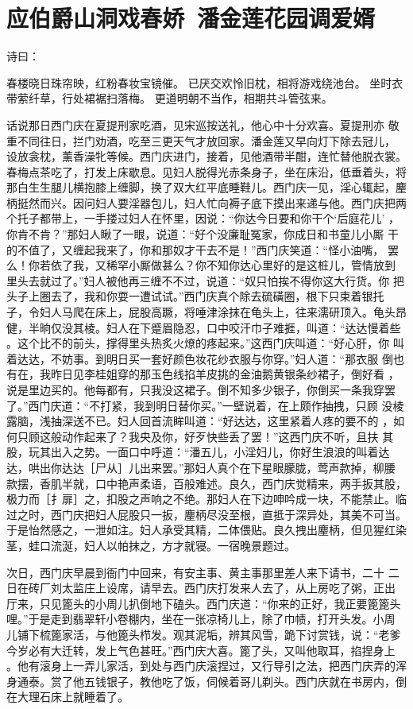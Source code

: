 \chapter{应伯爵山洞戏春娇~潘金莲花园调爱婿}

诗曰：

春楼晓日珠帘映，红粉春妆宝镜催。
已厌交欢怜旧枕，相将游戏绕池台。
坐时衣带萦纤草，行处裙裾扫落梅。
更道明朝不当作，相期共斗管弦来。

话说那日西门庆在夏提刑家吃酒，见宋巡按送礼，他心中十分欢喜。夏提刑亦
敬重不同往日，拦门劝酒，吃至三更天气才放回家。潘金莲又早向灯下除去冠儿，
设放衾枕，薰香澡牝等候。西门庆进门，接着，见他酒带半酣，连忙替他脱衣裳。
春梅点茶吃了，打发上床歇息。见妇人脱得光赤条身子，坐在床沿，低垂着头，将
那白生生腿儿横抱膝上缠脚，换了双大红平底睡鞋儿。西门庆一见，淫心辄起，麈
柄挺然而兴。因问妇人要淫器包儿，妇人忙向褥子底下摸出来递与他。西门庆把两
个托子都带上，一手搂过妇人在怀里，因说：“你达今日要和你干个‘后庭花儿’
，你肯不肯？”那妇人瞅了一眼，说道：“好个没廉耻冤家，你成日和书童儿小厮
干的不值了，又缠起我来了，你和那奴才干去不是！”西门庆笑道：“怪小油嘴，
罢么！你若依了我，又稀罕小厮做甚么？你不知你达心里好的是这桩儿，管情放到
里头去就过了。”妇人被他再三缠不不过，说道：“奴只怕挨不得你这大行货。你
把头子上圈去了，我和你耍一遭试试。”西门庆真个除去硫磺圈，根下只束着银托
子，令妇人马爬在床上，屁股高蹶，将唾津涂抹在龟头上，往来濡研顶入。龟头昂
健，半晌仅没其棱。妇人在下蹙眉隐忍，口中咬汗巾子难捱，叫道：“达达慢着些
。这个比不的前头，撑得里头热炙火燎的疼起来。”这西门庆叫道：“好心肝，你
叫着达达，不妨事。到明日买一套好颜色妆花纱衣服与你穿。”妇人道：“那衣服
倒也有在，我昨日见李桂姐穿的那玉色线掐羊皮挑的金油鹅黄银条纱裙子，倒好看
，说是里边买的。他每都有，只我没这裙子。倒不知多少银子，你倒买一条我穿罢
了。”西门庆道：“不打紧，我到明日替你买。”一壁说着，在上颇作抽拽，只顾
没棱露脑，浅抽深送不已。妇人回首流眸叫道：“好达达，这里紧着人疼的要不的
，如何只顾这般动作起来了？我央及你，好歹快些丢了罢！”这西门庆不听，且扶
其股，玩其出入之势。一面口中呼道：“潘五儿，小淫妇儿，你好生浪浪的叫着达
达，哄出你达达［尸从］儿出来罢。”那妇人真个在下星眼朦胧，莺声款掉，柳腰
款摆，香肌半就，口中艳声柔语，百般难述。良久，西门庆觉精来，两手扳其股，
极力而［扌扉］之，扣股之声响之不绝。那妇人在下边呻吟成一块，不能禁止。临
过之时，西门庆把妇人屁股只一扳，麈柄尽没至根，直抵于深异处，其美不可当。
于是怡然感之，一泄如注。妇人承受其精，二体偎贴。良久拽出麈柄，但见猩红染
茎，蛙口流涎，妇人以帕抹之，方才就寝。一宿晚景题过。

次日，西门庆早晨到衙门中回来，有安主事、黄主事那里差人来下请书，二十
二日在砖厂刘太监庄上设席，请早去。西门庆打发来人去了，从上房吃了粥，正出
厅来，只见篦头的小周儿扒倒地下磕头。西门庆道：“你来的正好，我正要篦篦头
哩。”于是走到翡翠轩小卷棚内，坐在一张凉椅儿上，除了巾帻，打开头发。小周
儿铺下梳篦家活，与他篦头栉发。观其泥垢，辨其风雪，跪下讨赏钱，说：“老爹
今岁必有大迁转，发上气色甚旺。”西门庆大喜。篦了头，又叫他取耳，掐捏身上
。他有滚身上一弄儿家活，到处与西门庆滚捏过，又行导引之法，把西门庆弄的浑
身通泰。赏了他五钱银子，教他吃了饭，伺候着哥儿剃头。西门庆就在书房内，倒
在大理石床上就睡着了。

